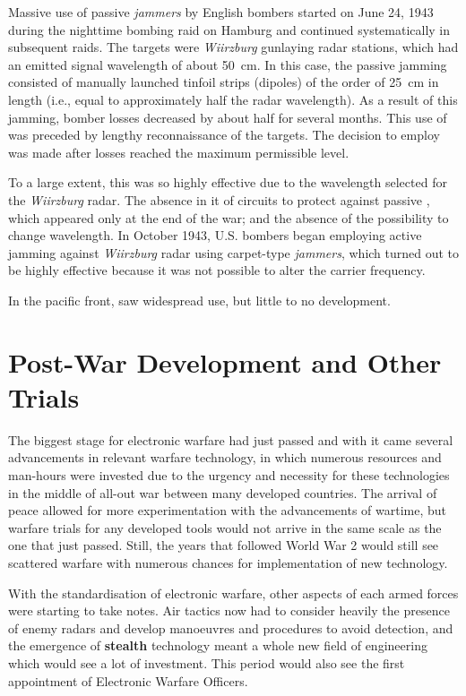 \documentclass[english,purist]{ist-report}
\begin{document}
Massive use of passive \textit{jammers} by English bombers started on June 24, 1943 during the nighttime bombing raid on Hamburg and continued systematically in subsequent raids. The \jamming{} targets were \textit{Wiirzburg} gunlaying radar stations, which had an emitted signal wavelength of about \SI{50}{\centi\meter}. In this case, the passive jamming consisted of manually launched tinfoil strips (dipoles) of the order of \SI{25}{\centi\meter} in length (i.e., equal to approximately half the radar wavelength). As a result of this jamming, bomber losses decreased by about half for several months. This use of \jamming{} was preceded by lengthy reconnaissance of the \jamming{} targets. The decision to employ \jamming{} was made after losses reached the maximum permissible level.

To a large extent, this \jamming{} was so highly effective due to the
wavelength selected for the \textit{Wiirzburg} radar. The absence in it of circuits to protect against passive \jamming{}, which appeared only at the end of the war; and the absence of the possibility to change wavelength. In October 1943, U.S. bombers began employing active jamming against \textit{Wiirzburg} radar using carpet-type \textit{jammers}, which turned out to be highly effective because it was not possible to alter the carrier frequency.

In the pacific front, \jamming{} saw widespread use, but little to no development.

\section{Post-War Development and Other Trials}

The biggest stage for electronic warfare had just passed and with it came several advancements in relevant warfare technology, in which numerous resources and man-hours were invested due to the urgency and necessity for these technologies in the middle of all-out war between many developed countries. The arrival of peace allowed for more experimentation with the advancements of wartime, but warfare trials for any developed tools would not arrive in the same scale as the one that just passed. Still, the years that followed World War 2 would still see scattered warfare with numerous chances for implementation of new technology.

With the standardisation of electronic warfare, other aspects of each armed forces were starting to take notes. Air tactics now had to consider heavily the presence of enemy radars and develop manoeuvres and procedures to avoid detection, and the emergence of \textbf{stealth} technology meant a whole new field of engineering which would see a lot of investment. This period would also see the first appointment of Electronic Warfare Officers.
\end{document}
